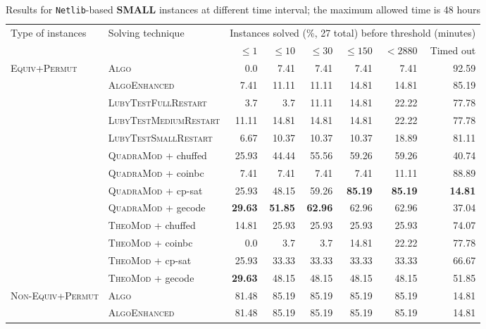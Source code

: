 \documentclass{book}
\begin{document}
\vspace{2cm}

\begin{table}[]\scriptsize\centering
\caption{Results for \texttt{Netlib}-based  {\bf SMALL } instances at different time interval; the maximum allowed time is 48 hours}
\begin{tabular}{@{}ll rr rr rr@{}}\toprule Type of instances & Solving technique  & \multicolumn{6}{c}{Instances solved (\%, 27 total) before threshold (minutes)}\\\cmidrule(l){3-8}&  &  $\leq 1$ &  $\leq 10$ &  $\leq 30$ &  $\leq 150$ &  $ < 2880$ & Timed out\\
\midrule
\multirow{10}{*}{\textsc{Equiv+Permut}} & \textsc{Algo}   & 0.0 & 7.41 & 7.41 & 7.41 & 7.41 & 92.59 \\
& \textsc{AlgoEnhanced}   & 7.41 & 11.11 & 11.11 & 14.81 & 14.81 & 85.19 \\
& \textsc{LubyTestFullRestart}   & 3.7 & 3.7 & 11.11 & 14.81 & 22.22 & 77.78 \\
& \textsc{LubyTestMediumRestart}   & 11.11 & 14.81 & 14.81 & 14.81 & 22.22 & 77.78 \\
& \textsc{LubyTestSmallRestart}   & 6.67 & 10.37 & 10.37 & 10.37 & 18.89 & 81.11 \\
& \textsc{QuadraMod} + chuffed   & 25.93 & 44.44 & 55.56 & 59.26 & 59.26 & 40.74 \\
& \textsc{QuadraMod} + coinbc   & 7.41 & 7.41 & 7.41 & 7.41 & 11.11 & 88.89 \\
& \textsc{QuadraMod} + cp-sat   & 25.93 & 48.15 & 59.26 & \bf 85.19 & \bf 85.19 &  \bf 14.81 \\
& \textsc{QuadraMod} + gecode   & \bf 29.63 & \bf 51.85 & \bf 62.96 & 62.96 & 62.96 & 37.04 \\
& \textsc{TheoMod} + chuffed   & 14.81 & 25.93 & 25.93 & 25.93 & 25.93 & 74.07 \\
& \textsc{TheoMod} + coinbc   & 0.0 & 3.7 & 3.7 & 14.81 & 22.22 & 77.78 \\
& \textsc{TheoMod} + cp-sat   & 25.93 & 33.33 & 33.33 & 33.33 & 33.33 & 66.67 \\
& \textsc{TheoMod} + gecode   & \bf 29.63 & 48.15 & 48.15 & 48.15 & 48.15 & 51.85 \\
\midrule\multirow{10}{*}{\textsc{Non-Equiv+Permut}} & \textsc{Algo}   & 81.48 & 85.19 & 85.19 & 85.19 & 85.19 & 14.81 \\
& \textsc{AlgoEnhanced}   & 81.48 & 85.19 & 85.19 & 85.19 & 85.19 & 14.81 \\

\end{tabular}
\end{table}
\end{document}
